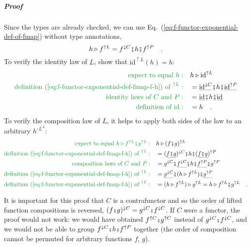 \subparagraph{Proof}

Since the types are already checked, we can use Eq.~(\ref{eq:f-functor-exponential-def-of-fmap})
without type annotations,
\begin{equation}
h\triangleright f^{\uparrow L}=f^{\downarrow C}\bef h\bef f^{\uparrow P}\quad.\label{eq:f-functor-exponential-def-fmap-f-h}
\end{equation}
To verify the identity law of $L$, show that $\text{id}^{\uparrow L}(h)=h$:
\begin{align*}
{\color{greenunder}\text{expect to equal }h:}\quad & h\triangleright\text{id}^{\uparrow L}\\
{\color{greenunder}\text{definition (\ref{eq:f-functor-exponential-def-fmap-f-h}) of }^{\uparrow L}:}\quad & =\gunderline{\text{id}^{\downarrow C}}\bef h\bef\gunderline{\text{id}^{\uparrow P}}\\
{\color{greenunder}\text{identity laws of }C\text{ and }P:}\quad & =\gunderline{\text{id}}\bef h\bef\gunderline{\text{id}}\\
{\color{greenunder}\text{definition of }\text{id}:}\quad & =h\quad.
\end{align*}
To verify the composition law of $L$, it helps to apply both sides
of the law to an arbitrary $h^{:L^{A}}$:
\begin{align*}
{\color{greenunder}\text{expect to equal }h\triangleright f^{\uparrow L}\bef g^{\uparrow L}:}\quad & h\triangleright(f\bef g)^{\uparrow L}\\
{\color{greenunder}\text{definition (\ref{eq:f-functor-exponential-def-fmap-f-h}) of }^{\uparrow L}:}\quad & =(\gunderline{f\bef g})^{\downarrow C}\bef h\bef(\gunderline{f\bef g})^{\uparrow P}\\
{\color{greenunder}\text{composition laws of }C\text{ and }P:}\quad & =g^{\downarrow C}\bef\gunderline{f^{\downarrow C}}\bef h\bef\gunderline{f^{\uparrow P}}\bef g^{\uparrow P}\\
{\color{greenunder}\text{definition (\ref{eq:f-functor-exponential-def-fmap-f-h}) of }^{\uparrow L}:}\quad & =\gunderline{g^{\downarrow C}}\bef(h\triangleright f^{\uparrow L})\bef\gunderline{g^{\uparrow P}}\\
{\color{greenunder}\text{definition (\ref{eq:f-functor-exponential-def-fmap-f-h}) of }^{\uparrow L}:}\quad & =(h\triangleright f^{\uparrow L})\triangleright g^{\uparrow L}=h\triangleright f^{\uparrow L}\bef g^{\uparrow L}\quad.
\end{align*}

It is important for this proof that $C$ is a contrafunctor and so
the order of lifted function compositions is reversed, $(f\bef g)^{\downarrow C}=g^{\downarrow C}\bef f^{\downarrow C}$.
If $C$ were a functor, the proof would not work: we would have obtained
$f^{\uparrow C}\bef g^{\uparrow C}$ instead of $g^{\downarrow C}\bef f^{\downarrow C}$,
and we would not be able to group $f^{\downarrow C}\bef h\bef f^{\uparrow P}$
together (the order of composition cannot be permuted for arbitrary
functions $f$, $g$).


